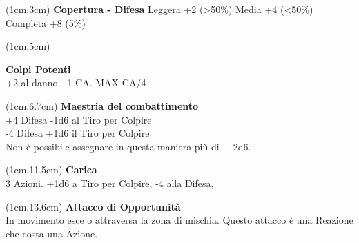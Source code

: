 \documentclass[a4paper,12 pt,openany]{book}
\begin{document}
\begin{textblock*}{4cm}(1cm,3cm) %
\textbf{Copertura - Difesa}
Leggera +2 (>50\%)
Media +4 (<50\%)
Completa +8 (5\%)	
	\end{textblock*}	

\begin{textblock*}{4cm}(1cm,5cm) %

\textbf{Colpi Potenti}\\
+2 al danno - 1 CA. MAX CA/4

	\end{textblock*}	

\begin{textblock*}{4cm}(1cm,6.7cm) %
\textbf{Maestria del combattimento}\\
+4 Difesa -1d6 al Tiro per Colpire\\
-4 Difesa +1d6 il Tiro per Colpire \\
Non è possibile assegnare in questa maniera più di +-2d6.
	\end{textblock*}	


\begin{textblock*}{4cm}(1cm,11.5cm) %
\textbf{Carica}\\
3 Azioni. +1d6 a Tiro per Colpire, -4 alla Difesa,
\end{textblock*}	


\begin{textblock*}{4cm}(1cm,13.6cm) %
	\textbf{Attacco di Opportunità}\\
In movimento esce o attraversa la zona di mischia.
Questo attacco è una Reazione che costa una Azione.	
\end{textblock*}	
	
\end{document}
